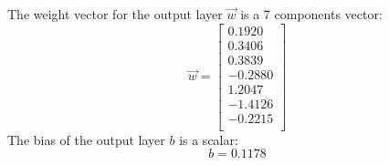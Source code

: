 \documentclass[twoside,english,1p,final,sort&compress]{elsarticle}
\theoremstyle{plain}
\begin{document}
The weight vector for the output layer $\overrightarrow{w}$ is a 7 components vector:
\begin{equation*}
\overrightarrow{w} = \left[
\begin{array}{r}
0.1920\\
0.3406\\
0.3839\\
-0.2880\\
1.2047\\
-1.4126\\
-0.2215\\
\end{array}\right]
\end{equation*}
The bias of the output layer $b$ is a scalar:
\begin{equation*}
b = 0.1178
\end{equation*}
\end{document}
